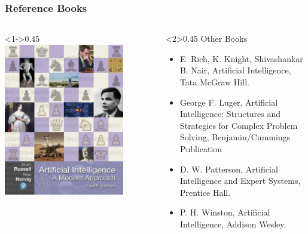 \documentclass{beamer}
\begin{document}
\begin{frame}
  \frametitle{Reference Books}
  \begin{columns}
    \begin{column}<1->{0.45\textwidth}
      \includegraphics[width=0.8\textwidth]{AIMABook.png}
    \end{column}
    \begin{column}<2>{0.45\textwidth}
      Other Books
      \begin{itemize}
        \item E. Rich, K. Knight, Shivashankar B. Nair, Artificial Intelligence, Tata McGraw Hill.
        \item George F. Luger, Artificial Intelligence: Structures and Strategies for Complex Problem Solving, Benjamin/Cummings Publication
        \item D. W. Patterson, Artificial Intelligence and Expert Systems, Prentice Hall.
        \item P. H. Winston, Artificial Intelligence, Addison Wesley.
      \end{itemize}
    \end{column}
  \end{columns}
\end{frame}
\end{document}
